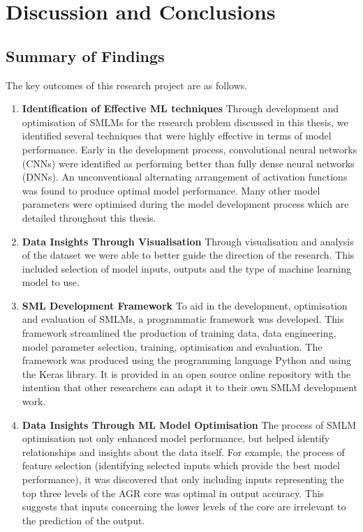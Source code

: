 \chapter{Discussion and Conclusions}

\section{Summary of Findings}

The key outcomes of this research project are as follows.

\begin{enumerate}
	\item \textbf{Identification of Effective ML techniques}
	Through development and optimisation of SMLMs for the research problem discussed in this thesis, we identified several techniques that were  highly effective in terms of model performance. Early in the development process, convolutional neural networks (CNNs) were identified as performing better than fully dense neural networks (DNNs). An unconventional alternating arrangement of activation functions was found to produce optimal model performance. Many other model parameters were optimised during the model development process which are detailed throughout this thesis.
	
	
	\item \textbf{Data Insights Through Visualisation} Through visualisation and analysis of the dataset we were able to better guide the direction of the research. This included selection of model inputs, outputs and the type of machine learning model to use.
	
	
	\item \textbf{SML Development Framework}  To aid in the development, optimisation and evaluation of SMLMs, a programmatic framework was developed. This framework streamlined the production of training data, data engineering, model parameter selection, training, optimisation and evaluation. The framework was produced using the programming language Python and using the Keras library. It is provided in an open source online repository with the intention that other researchers can adapt it to their own SMLM development work.
	
	\item \textbf{Data Insights Through ML Model Optimisation}
	The process of SMLM optimisation not only enhanced model performance, but helped identify relationships and insights about the data itself. For example, the process of feature selection (identifying selected inputs which provide the best model performance), it was discovered that only including inputs representing the top three levels of the AGR core was optimal in output accuracy. This suggests that inputs concerning the lower levels of the core are irrelevant to the prediction of the output.  
	

\end{enumerate}
